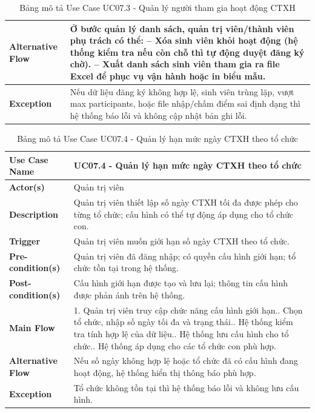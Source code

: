 \begin{table}[H]
\begin{tabular}{|p{3.8cm}|p{11.2cm}|}
		\textbf{Alternative Flow} & Ở bước quản lý danh sách, quản trị viên/thành viên phụ trách có thể:\newline
		-- Xóa sinh viên khỏi hoạt động (hệ thống kiểm tra nếu còn chỗ thì tự động duyệt đăng ký chờ).\newline
		-- Xuất danh sách sinh viên tham gia ra file Excel để phục vụ vận hành hoặc in biểu mẫu. \\ \hline
		\textbf{Exception} & Nếu dữ liệu đăng ký không hợp lệ, sinh viên trùng lặp, vượt max participants, hoặc file nhập/chấm điểm sai định dạng thì hệ thống báo lỗi và không cập nhật bản ghi lỗi. \\ \hline
	\end{tabular}
	\caption{Bảng mô tả Use Case UC07.3 - Quản lý người tham gia hoạt động CTXH}
\end{table}

\begin{table}[H]
	\centering
	\renewcommand{\arraystretch}{1.25}
	\begin{tabular}{|p{3.8cm}|p{11.2cm}|}
		\hline
		\textbf{Use Case Name} & \textbf{UC07.4 - Quản lý hạn mức ngày CTXH theo tổ chức} \\ \hline
		\textbf{Actor(s)} & Quản trị viên \\ \hline
		\textbf{Description} & Quản trị viên thiết lập số ngày CTXH tối đa được phép cho từng tổ chức; cấu hình có thể tự động áp dụng cho tổ chức con. \\ \hline
		\textbf{Trigger} & Quản trị viên muốn giới hạn số ngày CTXH theo tổ chức. \\ \hline
		\textbf{Pre-condition(s)} & Quản trị viên đã đăng nhập; có quyền cấu hình giới hạn; tổ chức tồn tại trong hệ thống. \\ \hline
		\textbf{Post-condition(s)} & Cấu hình giới hạn được tạo và lưu lại; thông tin cấu hình được phản ánh trên hệ thống. \\ \hline
		\textbf{Main Flow} & 1. Quản trị viên truy cập chức năng cấu hình giới hạn.\newline
		2. Chọn tổ chức, nhập số ngày tối đa và trạng thái.\newline
		3. Hệ thống kiểm tra tính hợp lệ của dữ liệu.\newline
		4. Hệ thống lưu cấu hình cho tổ chức.\newline
		5. Hệ thống áp dụng cho các tổ chức con phù hợp. \\ \hline
		\textbf{Alternative Flow} & Nếu số ngày không hợp lệ hoặc tổ chức đã có cấu hình đang hoạt động, hệ thống hiển thị thông báo phù hợp. \\ \hline
		\textbf{Exception} & Tổ chức không tồn tại thì hệ thống báo lỗi và không lưu cấu hình. \\ \hline
	\end{tabular}
	\caption{Bảng mô tả Use Case UC07.4 - Quản lý hạn mức ngày CTXH theo tổ chức}
\end{table}

